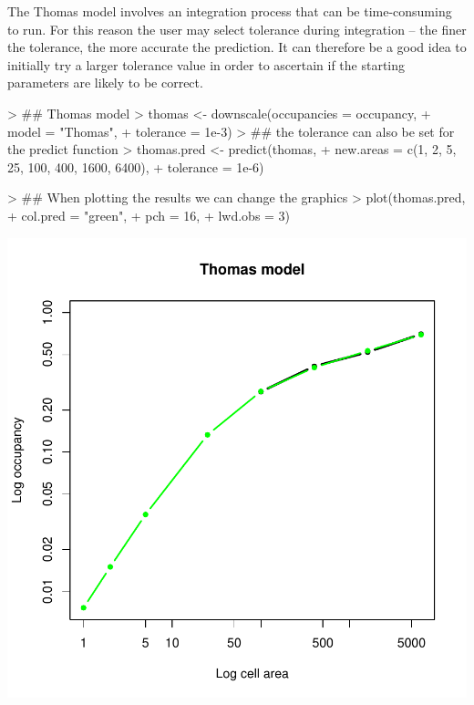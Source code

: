 \documentclass{article}[12pt, a4paper]
\begin{document}
The Thomas model involves an integration process that can be time-consuming to run. For this reason the user may select tolerance during integration – the finer the tolerance, the more accurate the prediction. It can therefore be a good idea to initially try a larger tolerance value in order to ascertain if the starting parameters are likely to be correct.

\begin{Schunk}
\begin{Sinput}
> ## Thomas model
> thomas <- downscale(occupancies = occupancy,
+                     model = "Thomas",
+                     tolerance = 1e-3)
> ## the tolerance can also be set for the predict function
> thomas.pred <- predict(thomas,
+                        new.areas = c(1, 2, 5, 25, 100, 400, 1600, 6400),
+                        tolerance = 1e-6)
\end{Sinput}
\end{Schunk}
\begin{Schunk}
\begin{Sinput}
> ## When plotting the results we can change the graphics
> plot(thomas.pred,
+      col.pred = "green",
+      pch = 16,
+      lwd.obs = 3)
\end{Sinput}
\end{Schunk}
\includegraphics{Downscaling-downscale16}
\end{document}
